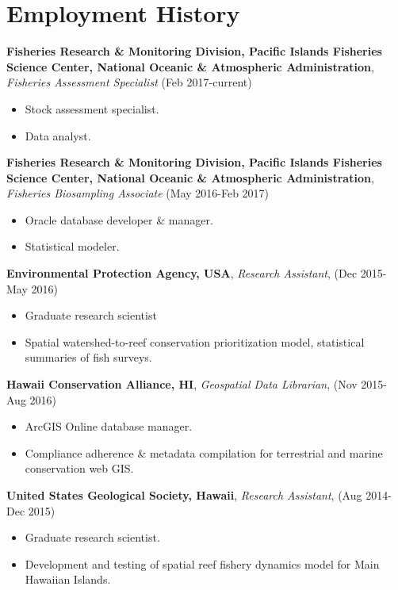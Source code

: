 \documentclass[10pt, letterpaper]{article}
\begin{document}
\section*{Employment History}
\textbf{Fisheries Research \& Monitoring Division, Pacific Islands Fisheries Science Center, National Oceanic \& Atmospheric Administration}, \textit{Fisheries Assessment Specialist} (Feb 2017-current)
\begin{itemize}
\vspace{-2.5mm}
  \item Stock assessment specialist.
  \item Data analyst.
\end{itemize}
\textbf{Fisheries Research \& Monitoring Division, Pacific Islands Fisheries Science Center, National Oceanic \& Atmospheric Administration}, \textit{Fisheries Biosampling Associate} (May 2016-Feb 2017)
\begin{itemize}
\vspace{-2.5mm}
\item Oracle database developer \& manager.
\item Statistical modeler.
\end{itemize}
\textbf{Environmental Protection Agency, USA}, \textit{Research Assistant}, (Dec 2015- May 2016)
\begin{itemize}
\vspace{-2.5mm}
\item Graduate research scientist
\item Spatial watershed-to-reef conservation prioritization model, statistical summaries of fish surveys.
\end{itemize}
\textbf{Hawaii Conservation Alliance, HI}, \textit{Geospatial Data Librarian}, (Nov 2015- Aug 2016)
\begin{itemize}
\vspace{-2.5mm}
\item ArcGIS Online database manager.
\item Compliance adherence \& metadata compilation for terrestrial and marine conservation web GIS.
\end{itemize}
\textbf{United States Geological Society, Hawaii}, \textit{Research Assistant}, (Aug 2014- Dec 2015)
\begin{itemize}
\vspace{-2.5mm}
\item Graduate research scientist.
\item Development and testing of spatial reef fishery dynamics model for Main Hawaiian Islands.
\end{itemize}
\end{document}
